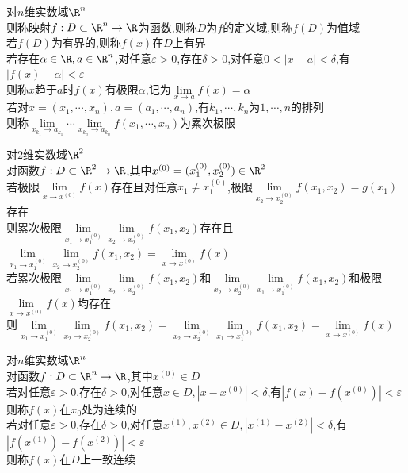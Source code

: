 \begin{dingyi}
对$n$维实数域$\R^n$\\
则称映射$f:D\subset \R^n\to \R$为函数,则称$D$为$f$的定义域,则称$f(D)$为值域\\
若$f(D)$为有界的,则称$f(x)$在$D$上有界\\
若存在$\alpha\in\R,a\in \R^n$,对任意$\varepsilon>0$,存在$\delta>0$,对任意$0<|x-a|<\delta$,有$|f(x)-\alpha|<\varepsilon$\\
则称$x$趋于$a$时$f(x)$有极限$\alpha$,记为$\lim\limits_{x\to a}f(x)=\alpha$\\
若对$x=(x_1,\cdots,x_n),a=(a_1,\cdots,a_n)$,有$k_1,\cdots,k_n$为$1,\cdots,n$的排列\\
则称$\lim\limits_{x_{k_1}\to a_{k_1}}\cdots\lim\limits_{x_{k_n}\to a_{k_n}}f(x_1,\cdots,x_n)$为累次极限
\end{dingyi}

\begin{dingli}
对$2$维实数域$\R^2$\\
对函数$f:D\subset\R^2\to\R$,其中$x^{(0)}=(x_1^{(0)},x_2^{(0)})\in\R^2$\\
若极限$\lim\limits_{x\to x^{(0)}}f(x)$存在且对任意$x_1\neq x_1^{(0)}$,极限$\lim\limits_{x_2\to x_2^{(0)}}f(x_1,x_2)=g(x_1)$存在\\
则累次极限$\lim\limits_{x_1\to x_1^{(0)}}\lim\limits_{x_2\to x_2^{(0)}}f(x_1,x_2)$存在且$\lim\limits_{x_1\to x_1^{(0)}}\lim\limits_{x_2\to x_2^{(0)}}f(x_1,x_2)=\lim\limits_{x\to x^{(0)}}f(x)$\\
若累次极限$\lim\limits_{x_1\to x_1^{(0)}}\lim\limits_{x_2\to x_2^{(0)}}f(x_1,x_2)$和$\lim\limits_{x_2\to x_2^{(0)}}\lim\limits_{x_1\to x_1^{(0)}}f(x_1,x_2)$和极限$\lim\limits_{x\to x^{(0)}}f(x)$均存在\\
则$\lim\limits_{x_1\to x_1^{(0)}}\lim\limits_{x_2\to x_2^{(0)}}f(x_1,x_2)=\lim\limits_{x_2\to x_2^{(0)}}\lim\limits_{x_1\to x_1^{(0)}}f(x_1,x_2)=\lim\limits_{x\to x^{(0)}}f(x)$
\end{dingli}

\begin{dingyi}
对$n$维实数域$\R^n$\\
对函数$f:D\subset \R^n \to \R$,其中$x^{(0)}\in D$\\
若对任意$\varepsilon>0$,存在$\delta>0$,对任意$x\in D,|x-x^{(0)}|<\delta$,有$|f(x)-f(x^{(0)})|<\varepsilon$\\
则称$f(x)$在$x_0$处为连续的\\
若对任意$\varepsilon>0$,存在$\delta>0$,对任意$x^{(1)},x^{(2)}\in D,|x^{(1)}-x^{(2)}|<\delta$,有$|f(x^{(1)})-f(x^{(2)})|<\varepsilon$\\
则称$f(x)$在$D$上一致连续
\end{dingyi}

